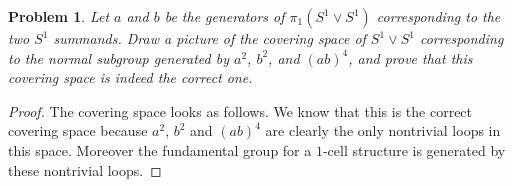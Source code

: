 \documentclass{article}
\newtheorem{problem}{Problem}
\begin{document}
\begin{problem}
Let $a$ and $b$ be the generators of $\pi_1(S^1 \vee S^1)$ corresponding to the two $S^1$ summands. Draw a picture of the covering space of $S^1 \vee S^1$ corresponding to the normal subgroup generated by $a^2$, $b^2$, and $(ab)^4$, and prove that this covering space is indeed the correct one.
\end{problem}
\begin{proof}
The covering space looks as follows.
\vspace{150pt}
We know that this is the correct covering space because $a^2$, $b^2$ and $(ab)^4$ are clearly the only nontrivial loops in this space. Moreover the fundamental group for a $1$-cell structure is generated by these nontrivial loops.
\end{proof}
\end{document}
